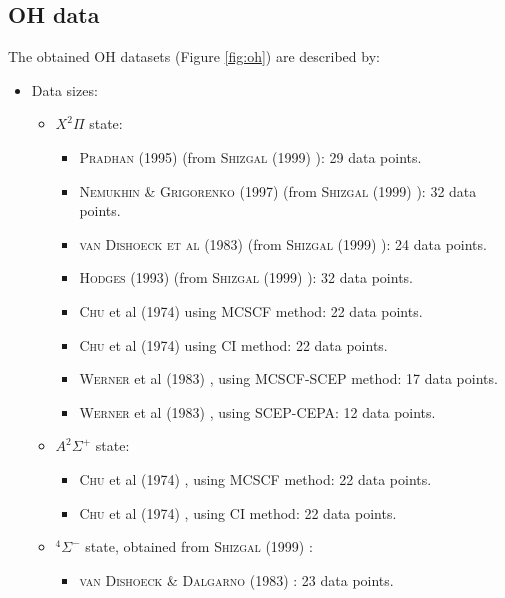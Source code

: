 \documentclass[12pt]{article}
\begin{document}
\subsection{OH data}
The obtained OH datasets (Figure \ref{fig:oh}) are described by:
\begin{itemize}
    \item Data sizes:
    \begin{itemize}
        \item $X^2\Pi$ state:
        \begin{itemize}
            \item \textsc{Pradhan} (1995) \cite{idx163} (from \textsc{Shizgal} (1999) \cite{idx156}): 29 data points.
            \item \textsc{Nemukhin \& Grigorenko} (1997) \cite{idx160} (from \textsc{Shizgal} (1999) \cite{idx156}): 32 data points.
            \item \textsc{van Dishoeck et al} (1983) \cite{idx161} (from \textsc{Shizgal} (1999) \cite{idx156}): 24 data points.
            \item \textsc{Hodges} (1993) \cite{idx162} (from \textsc{Shizgal} (1999) \cite{idx156}): 32 data points.
            \item \textsc{Chu} et al (1974) \cite{idx159} using MCSCF method: 22 data points.
            \item \textsc{Chu} et al (1974) \cite{idx159} using CI method: 22 data points.
            \item \textsc{Werner} et al (1983) \cite{idx171}, using MCSCF-SCEP method: 17 data points.
            \item \textsc{Werner} et al (1983) \cite{idx171}, using SCEP-CEPA: 12 data points.
        \end{itemize}
        \item $A^2\Sigma^+$ state:
        \begin{itemize}
            \item \textsc{Chu} et al (1974) \cite{idx159}, using MCSCF method: 22 data points.
            \item \textsc{Chu} et al (1974) \cite{idx159}, using CI method: 22 data points.
        \end{itemize}
        \item $^4\Sigma^-$ state, obtained from \textsc{Shizgal} (1999) \cite{idx156}:
        \begin{itemize}
            \item \textsc{van Dishoeck \& Dalgarno} (1983) \cite{idx164}: 23 data points.

\end{itemize}
\end{itemize}
\end{itemize}
\end{document}
